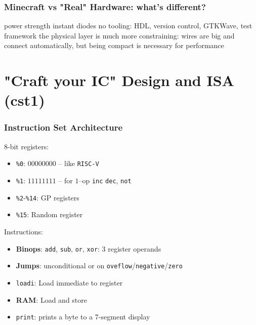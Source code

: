 \documentclass[aspectratio=169]{beamer}
\newcommand{\rv}{\texttt{RISC-V}}
\newcommand{\vrv}{\texttt{V-\rv}}
\begin{document}
\begin{frame}
	\frametitle{Minecraft vs "Real" Hardware: what's different?}
	power strength
	instant diodes
	no tooling: HDL, version control, GTKWave, test framework
	the physical layer is much more constraining: wires are big and connect automatically, but being compact is necessary for performance
\end{frame}

\section{"Craft your IC" Design and ISA (cst1)}


\begin{frame}
	\frametitle{Instruction Set Architecture}

	$8$-bit registers:

	\begin{itemize}
		\item \texttt{\%0}: $00000000$ -- like \rv{}
		\item \texttt{\%1}: $11111111$ -- for $1$--op \texttt{inc}
		      \texttt{dec}, \texttt{not}
		\item \texttt{\%2}-\texttt{\%14}: GP registers
		\item \texttt{\%15}: Random register
	\end{itemize}

	\pause

	Instructions:
	\begin{itemize}
		\item \textbf{Binops}: \texttt{add}, \texttt{sub}, \texttt{or},
		      \texttt{xor}: $3$ register operands
		\item \textbf{Jumps}: unconditional or on
		      \texttt{oveflow}/\texttt{negative}/\texttt{zero}
		\item \texttt{loadi}: Load immediate to register
		\item \textbf{RAM}: Load and store
		\item \texttt{print}: prints a byte to a 7-segment display
	\end{itemize}
\end{frame}
\end{document}
